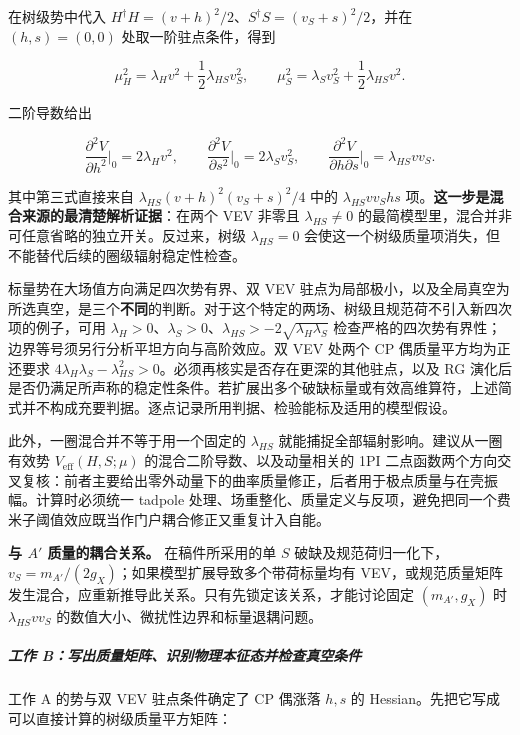 \documentclass[
  chinese,
  UTF8]{ctexart}
\begin{document}
在树级势中代入
\(H^\dagger H=(v+h)^2/2\)、\(S^\dagger S=(v_S+s)^2/2\)，并在
\((h,s)=(0,0)\) 处取一阶驻点条件，得到

\[
\mu_H^2=\lambda_Hv^2+\frac12\lambda_{HS}v_S^2,\qquad
\mu_S^2=\lambda_Sv_S^2+\frac12\lambda_{HS}v^2.
\]

二阶导数给出

\[
\frac{\partial^2V}{\partial h^2}\Big|_0=2\lambda_Hv^2,\qquad
\frac{\partial^2V}{\partial s^2}\Big|_0=2\lambda_Sv_S^2,\qquad
\frac{\partial^2V}{\partial h\partial s}\Big|_0=\lambda_{HS}vv_S.
\]

其中第三式直接来自 \(\lambda_{HS}(v+h)^2(v_S+s)^2/4\) 中的
\(\lambda_{HS}vv_S hs\)
项。\textbf{这一步是混合来源的最清楚解析证据}：在两个 VEV 非零且
\(\lambda_{HS}\ne0\)
的最简模型里，混合并非可任意省略的独立开关。反过来，树级
\(\lambda_{HS}=0\)
会使这一个树级质量项消失，但不能替代后续的圈级辐射稳定性检查。

标量势在大场值方向满足四次势有界、双 VEV
驻点为局部极小，以及全局真空为所选真空，是三个\textbf{不同}的判断。对于这个特定的两场、树级且规范荷不引入新四次项的例子，可用
\(\lambda_H>0\)、\(\lambda_S>0\)、\(\lambda_{HS}>-2\sqrt{\lambda_H\lambda_S}\)
检查严格的四次势有界性；边界等号须另行分析平坦方向与高阶效应。双 VEV
处两个 CP 偶质量平方均为正还要求
\(4\lambda_H\lambda_S-\lambda_{HS}^2>0\)。必须再核实是否存在更深的其他驻点，以及
RG
演化后是否仍满足所声称的稳定性条件。若扩展出多个破缺标量或有效高维算符，上述简式并不构成充要判据。逐点记录所用判据、检验能标及适用的模型假设。

此外，一圈混合并不等于用一个固定的 \(\lambda_{HS}\)
就能捕捉全部辐射影响。建议从一圈有效势 \(V_{\mathrm{eff}}(H,S;\mu)\)
的混合二阶导数、以及动量相关的 1PI
二点函数两个方向交叉复核：前者主要给出零外动量下的曲率质量修正，后者用于极点质量与在壳振幅。计算时必须统一
tadpole
处理、场重整化、质量定义与反项，避免把同一个费米子阈值效应既当作门户耦合修正又重复计入自能。

\textbf{与 \(A'\) 质量的耦合关系。} 在稿件所采用的单 \(S\)
破缺及规范荷归一化下，\(v_S=m_{A'}/(2g_X)\)；如果模型扩展导致多个带荷标量均有
VEV，或规范质量矩阵发生混合，应重新推导此关系。只有先锁定该关系，才能讨论固定
\((m_{A'},g_X)\) 时 \(\lambda_{HS}vv_S\)
的数值大小、微扰性边界和标量退耦问题。

\subparagraph{工作
B：写出质量矩阵、识别物理本征态并检查真空条件}\label{ux5de5ux4f5c-bux5199ux51faux8d28ux91cfux77e9ux9635ux8bc6ux522bux7269ux7406ux672cux5f81ux6001ux5e76ux68c0ux67e5ux771fux7a7aux6761ux4ef6}

工作 A 的势与双 VEV 驻点条件确定了 CP 偶涨落 \(h,s\) 的
Hessian。先把它写成可以直接计算的树级质量平方矩阵：
\end{document}
